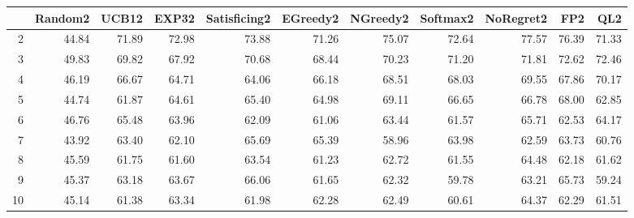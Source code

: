 \begin{table}[ht]
\centering
\begin{tabular}{rrrrrrrrrrr}
  \hline
 & Random2 & UCB12 & EXP32 & Satisficing2 & EGreedy2 & NGreedy2 & Softmax2 & NoRegret2 & FP2 & QL2 \\ 
  \hline
2 & 44.84 & 71.89 & 72.98 & 73.88 & 71.26 & 75.07 & 72.64 & 77.57 & 76.39 & 71.33 \\ 
  3 & 49.83 & 69.82 & 67.92 & 70.68 & 68.44 & 70.23 & 71.20 & 71.81 & 72.62 & 72.46 \\ 
  4 & 46.19 & 66.67 & 64.71 & 64.06 & 66.18 & 68.51 & 68.03 & 69.55 & 67.86 & 70.17 \\ 
  5 & 44.74 & 61.87 & 64.61 & 65.40 & 64.98 & 69.11 & 66.65 & 66.78 & 68.00 & 62.85 \\ 
  6 & 46.76 & 65.48 & 63.96 & 62.09 & 61.06 & 63.44 & 61.57 & 65.71 & 62.53 & 64.17 \\ 
  7 & 43.92 & 63.40 & 62.10 & 65.69 & 65.39 & 58.96 & 63.98 & 62.59 & 63.73 & 60.76 \\ 
  8 & 45.59 & 61.75 & 61.60 & 63.54 & 61.23 & 62.72 & 61.55 & 64.48 & 62.18 & 61.62 \\ 
  9 & 45.37 & 63.18 & 63.67 & 66.06 & 61.65 & 62.32 & 59.78 & 63.21 & 65.73 & 59.24 \\ 
  10 & 45.14 & 61.38 & 63.34 & 61.98 & 62.28 & 62.49 & 60.61 & 64.37 & 62.29 & 61.51 \\ 
   \hline
\end{tabular}
\end{table}

